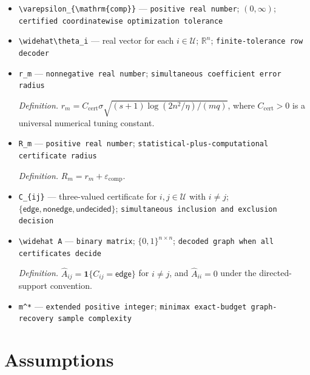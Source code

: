 \documentclass{article}
\begin{document}
\begin{itemize}
  \par\smallskip\noindent\emph{Definition.} \(\theta_i^{\mathrm D}=\arg\min\{\lVert u\rVert_2^2/2:u\in\mathcal D_i,\ \lVert u\rVert_1\le v_i\}\).
  \item \texttt{\textbackslash{}\allowbreak{}varepsilon\_\allowbreak{}\{\textbackslash{}\allowbreak{}mathrm\{comp\}\allowbreak{}\}\allowbreak{}} --- \texttt{positive real number}; \((0,\infty)\); \texttt{certified coordinatewise optimization tolerance}
  \item \texttt{\textbackslash{}\allowbreak{}widehat\textbackslash{}\allowbreak{}theta\_\allowbreak{}i} --- real vector for each \(i\in\mathcal U\); \(\mathbb R^n\); \texttt{finite-\allowbreak{}tolerance row decoder}
  \item \texttt{r\_\allowbreak{}m} --- \texttt{nonnegative real number}; \texttt{simultaneous coefficient error radius}
  \par\smallskip\noindent\emph{Definition.} \(r_m=C_{\mathrm{cert}}\sigma\sqrt{(s+1)\log(2n^2/\eta)/(mq)}\), where \(C_{\mathrm{cert}}>0\) is a universal numerical tuning constant.
  \item \texttt{R\_\allowbreak{}m} --- \texttt{positive real number}; \texttt{statistical-\allowbreak{}plus-\allowbreak{}computational certificate radius}
  \par\smallskip\noindent\emph{Definition.} \(R_m=r_m+\varepsilon_{\mathrm{comp}}\).
  \item \texttt{C\_\allowbreak{}\{ij\}\allowbreak{}} --- three-valued certificate for \(i,j\in\mathcal U\) with \(i\ne j\); \(\{\mathsf{edge},\mathsf{nonedge},\mathsf{undecided}\}\); \texttt{simultaneous inclusion and exclusion decision}
  \item \texttt{\textbackslash{}\allowbreak{}widehat A} --- \texttt{binary matrix}; \(\{0,1\}^{n\times n}\); \texttt{decoded graph when all certificates decide}
  \par\smallskip\noindent\emph{Definition.} \(\widehat A_{ij}=\mathbf 1\{C_{ij}=\mathsf{edge}\}\) for \(i\ne j\), and \(\widehat A_{ii}=0\) under the directed-support convention.
  \item \texttt{m\textasciicircum{}*} --- \texttt{extended positive integer}; \texttt{minimax exact-\allowbreak{}budget graph-\allowbreak{}recovery sample complexity}
\end{itemize}

\section{Assumptions}
\end{document}
